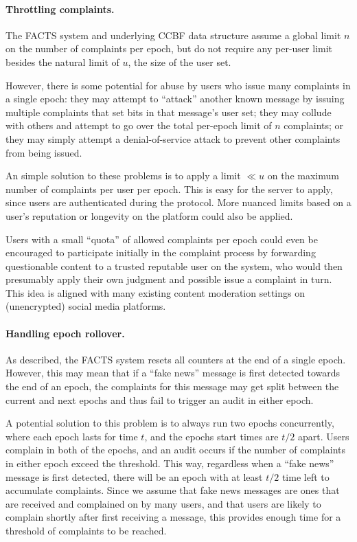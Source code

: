 \paragraph{Throttling complaints.}
The FACTS system and underlying CCBF data structure assume a global limit $n$
on the number of complaints per epoch, but do not require any per-user limit
besides the natural limit of $u$, the size of the user set.

However, there is some potential for abuse by users who issue many complaints in
a single epoch: they may attempt to ``attack'' another known message by issuing
multiple complaints that set bits in that message's user set;
they may collude with others and attempt to go over the total per-epoch limit of
$n$ complaints; or they may simply attempt a denial-of-service attack to prevent
other complaints from being issued.

An simple solution to these problems is to apply a limit $\ll u$ on the maximum
number of complaints per user per epoch.  This is easy for the server to apply,
since users are authenticated during the \complain{} protocol. More nuanced limits
based on a user's reputation or longevity on the platform could also be applied.

Users with a small ``quota'' of allowed complaints per epoch could even be encouraged
to participate initially in the complaint process by forwarding questionable content
to a trusted reputable user on the system, who would then presumably apply their
own judgment and possible issue a complaint in turn. This idea is aligned with
many existing content moderation settings on (unencrypted) social media platforms.

\paragraph{Handling epoch rollover.}  As described, the FACTS system resets all counters at the end of a single epoch.  However, this may mean that if a ``fake news'' message is first detected towards the end of an epoch, the complaints for this message may get split between the current and next epochs and thus fail to trigger an audit in either epoch.

A potential solution to this problem is to always run two epochs concurrently, where each epoch lasts for time $t$, and the epochs start times are $t/2$ apart.  Users complain in both of the epochs, and an audit occurs if the number of complaints in either epoch exceed the threshold.  This way, regardless when a ``fake news'' message is first detected, there will be an epoch with at least $t/2$ time left to accumulate complaints.  Since we assume that fake news messages are ones that are received and complained on by many users, and that users are likely to complain shortly after first receiving a message, this provides enough time for a threshold of complaints to be reached.  

